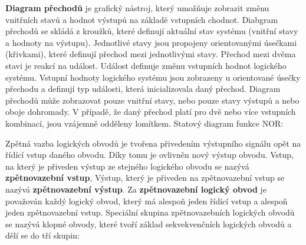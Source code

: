 \vskip 4mm
\centerline{}
\vskip 4mm

{\bf Diagram přechodů} je grafický nástroj, který umožňuje zobrazit změnu vnitřních stavů a hodnot výstupů na základě vstupních chodnot. Diabgram přechodů se skládá z kroužků, které definují aktuální stav systému (vnitřní stavy a hodnoty na výstupu). Jednotlivé stavy jsou propojeny orientovanými úsečkami (křivkami), které definují přechod mezi jednotlivými stavy. Přechod mezi dvěma stavi je reakcí na událost. Událost definuje změnu vstupních hodnot logického systému. Vstupní hodnoty logického systému jsou zobrazeny u orientované úsečky přechodu a definují typ události, která inicializovala daný přechod. Diagram přechodů může zobrazovat pouze vnitřní stavy, nebo pouze stavy výstupů a nebo oboje dohromady. V případě, že daný přechod platí pro dvě nebo více vstupních kombinací, jsou vzájemně odděleny lomítkem.	 Statový diagram funkce NOR:

\vskip 4mm
\centerline{}
\vskip 4mm


Zpětná vazba logických obvodů je tvořena přivedením výstupního signálu opět na řídící vstup daného obvodu. Díky tomu je ovlivněn nový výstup obvodu. Vstup, na který je přiveden výstup ze stejného logického obvodu se nazývá {\bf zpětnovazební vstup}, Výstup, který je přiveden na zpětnovazební vstup se nazývá {\bf zpětnovazební výstup}. Za {\bf zpětnovazební logický obvod} je považován každý logický obvod, který má alespoň jeden řídící vstup a alespoň jeden zpětnovazební vstup. Speciální skupina zpětnovazebních logických obvodů se nazývá klopné obvody, které tvoří základ sekvekvenčních logických obvodů a dělí se do tří skupin:

\vskip 4mm
\vskip 4mm

